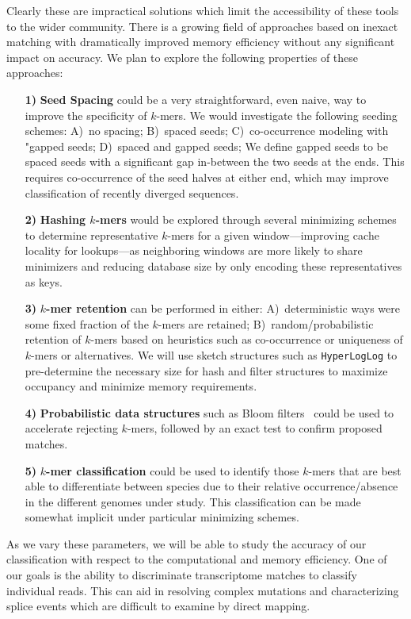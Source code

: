 \documentclass{elsarticle}
\begin{document}
Clearly these are impractical solutions which limit the accessibility
of these tools to the wider community. There is a growing field of
approaches based on inexact matching with dramatically improved memory
efficiency without any significant impact on accuracy. We plan to
explore the following properties of these approaches:
%
\begin{itemize}
%
\item[\textbf{1)}] \textbf{Seed Spacing} could be a very
straightforward, even naive, way to improve the specificity of
$k$-mers. We would investigate the following seeding schemes: A)~no
spacing; B)~spaced seeds; C)~co-occurrence modeling with "gapped
seeds; D)~spaced and gapped seeds; We define gapped seeds to be spaced
seeds with a significant gap in-between the two seeds at the ends.
This requires co-occurrence of the seed halves at either end, which
may improve classification of recently diverged sequences.
%
\item[\textbf{2)}] \textbf{Hashing $k$-mers} would be explored through
several minimizing schemes to determine representative $k$-mers for a
given window---improving cache locality for lookups---as neighboring
windows are more likely to share minimizers and reducing database size
by only encoding these representatives as keys.
%
\item[\textbf{3)}] \textbf{$k$-mer retention} can be performed in
either: A)~deterministic ways were some fixed fraction of the $k$-mers
are retained; B)~random/probabilistic retention of $k$-mers based on
heuristics such as co-occurrence or uniqueness of $k$-mers or
alternatives. We will use sketch structures such as
\texttt{HyperLogLog} to pre-determine the necessary size for hash and
filter structures to maximize occupancy and minimize memory
requirements.
%
\item[\textbf{4)}] \textbf{Probabilistic data structures} such as
Bloom filters~\citep{bloom1970acm} could be used to accelerate
rejecting $k$-mers, followed by an exact test to confirm proposed
matches.
%
\item[\textbf{5)}] \textbf{$k$-mer classification} could be used to
identify those $k$-mers that are best able to differentiate between
species due to their relative occurrence/absence in the different
genomes under study. This classification can be made somewhat implicit
under particular minimizing schemes.
%
\end{itemize}

As we vary these parameters, we will be able to study the accuracy of
our classification with respect to the computational and memory
efficiency. One of our goals is the ability to discriminate
transcriptome matches to classify individual reads. This can aid in
resolving complex mutations and characterizing splice events which are
difficult to examine by direct mapping.
\end{document}
